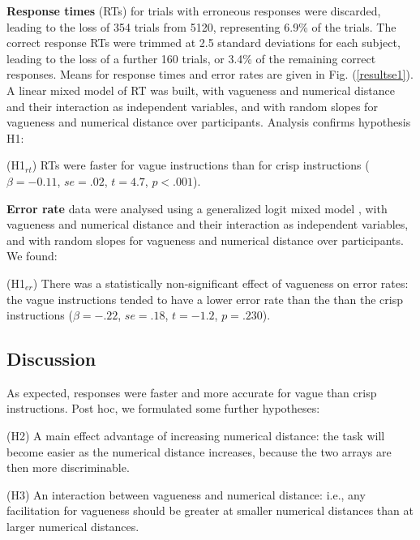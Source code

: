 \documentclass[%
man,		%
floatsintext,%
apacite%
]{apa6} %
\begin{document}
{\bf Response times} (RTs) for trials with erroneous responses were discarded, leading to the loss of 354 trials from 5120, representing 6.9\% of the trials. 
The correct response RTs were trimmed at 2.5 standard deviations for each subject, leading to the loss of a further 160 trials, or 3.4\% of the remaining correct responses. 
Means for response times and error rates are given in Fig. (\ref{resultse1}).
A linear mixed model of RT was built, with vagueness and numerical distance and their interaction as independent variables, and with random slopes for vagueness and numerical distance over participants. Analysis confirms hypothesis H1:

{\small
\begin{APAenumerate}
	\item [(H1$_{rt}$)] RTs were faster for vague instructions than for crisp instructions 
	($\beta=-0.11$, $se=.02$, $t=4.7$, $p<.001$).  %
\end{APAenumerate}
}

{\bf Error rate} data were analysed using a generalized logit mixed model \cite{jaeger2008categorical}, with vagueness and numerical distance and their interaction as independent variables, and with random slopes for vagueness and numerical distance over participants. We found:

{\small
\begin{APAenumerate}
	\item [(H1$_{er}$)] There was a statistically non-significant effect of vagueness on error rates: the vague instructions tended to have a lower error rate than the than the crisp instructions 
	($\beta=-.22$, $se=.18$, $t=-1.2$, $p=.230$).  %
\end{APAenumerate}
}

\subsection{Discussion}

\noindent As expected, responses were faster and more accurate for vague than crisp instructions. Post hoc, we formulated some further hypotheses:

{\small
\begin{APAenumerate}
	\item [(H2)] A main effect advantage of increasing numerical distance: the task will become easier as the numerical distance increases, because the two arrays are then more discriminable.
	\item [(H3)] An interaction between vagueness and numerical distance: i.e., any facilitation for vagueness should be greater at smaller numerical distances than at larger numerical distances.
\end{APAenumerate}
}
\end{document}
